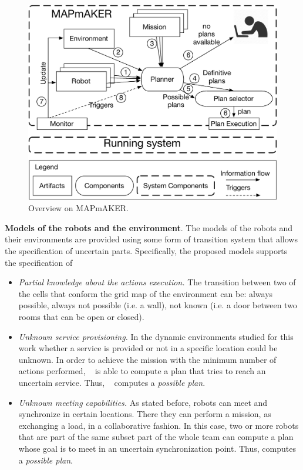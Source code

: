 \begin{figure}[h]
\begin{center}
\includegraphics[width=1\linewidth]{Figures/MAPmAKER.pdf}
\caption{Overview on  MAPmAKER.}
\label{fig:overview}
\end{center}
\end{figure}


\textbf{Models of the robots and the environment}. 
The models of the robots and their environments are provided using some form of transition system that allows the specification of uncertain parts.
Specifically, the proposed models supports the specification of
\begin{itemize}
\item  \emph{Partial knowledge about the actions execution.} 
The transition between two of the cells that conform the grid map of the environment can be:
always possible, always not possible (i.e. a wall), not known (i.e. a door between two rooms that can be open or closed).
\item \emph{Unknown service provisioning.} 
In the dynamic environments studied for this work whether a service is provided or not in a specific location could be unknown. 
In order to achieve the mission with the minimum number of actions performed, \toolName~ is able to compute a plan that tries to reach an uncertain service.
Thus, \toolName~ computes a \emph{possible plan}.
\item \emph{Unknown meeting capabilities.} 
As stated before, robots can meet and synchronize in certain locations.
There they can perform a mission, as exchanging a load, in a collaborative fashion.
In this case, two or more robots that are part of the same subset part of the whole team can compute a plan whose goal is to meet in an uncertain synchronization point.
Thus, \toolName computes a \emph{possible plan}.
\end{itemize}

